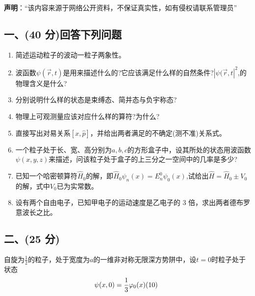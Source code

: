 
\textbf{声明}：“该内容来源于网络公开资料，不保证真实性，如有侵权请联系管理员”

\subsection{一、(40 分)回答下列问题}
\begin{enumerate}
\item 简述运动粒子的波动一粒子两象性。
\item 波函数$\psi(\vec{r},t)$是用来描述什么的?它应该满足什么样的自然条件?$|\psi(\vec{r},t|^2$,的物理含义是什么?
\item 分别说明什么样的状态是束缚态、简并态与负宇称态?
\item 物理上可观测量应该对应什么样的算符?为什么?
\item 直接写出对易关系$[x,\hat{p}]$，并给出两者满足的不确定(测不准)关系式。
\item 一个粒子处于长、宽、高分别为$a,b,c$的方形盒子中，设其所处的状态用波函数$\psi(x,y,z)$来描述，问该粒子处于盒子的上三分之一空间中的几率是多少?
\item 已知一个哈密顿算符$\hat{H}_0$的解，即$\hat{H}_0\psi_n(x)=E^0_n\psi_0(x)$,试给出$\hat{H}=\hat{H}_0\pm V_0$的解，式中$V_0$已为实常数。
\item 设有两个自由电子，已知甲电子的运动速度是乙电子的 3 倍，求出两者德布罗意波长之比。
\end{enumerate}
\subsection{二、(25 分)}
自旋为$\frac{1}{2}$的粒子，处于宽度为$a$的一维非对称无限深方势阱中，设$t=0$时粒子处于状态
$$\psi(x,0)=\frac{1}{3}\varphi_0(x)(1\\0)~$$